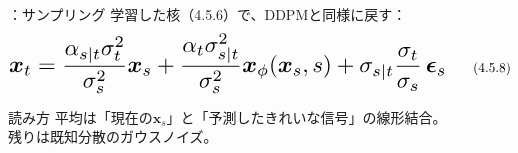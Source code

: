 \assuppl
\begin{frame}{\supplmark：サンプリング}
    学習した核（4.5.6）で、DDPMと同様に戻す：
    \[
        \resizebox{0.95\textwidth}{!}{$
        \bm{x}_t
        =
        \dfrac{\alpha_{s|t}\sigma_t^{2}}{\sigma_s^{2}}\bm{x}_s
        +
        \dfrac{\alpha_t\sigma_{s|t}^{2}}{\sigma_s^{2}}\bm{x}_\phi(\bm{x}_s,s)
        +
        \sigma_{s|t}\dfrac{\sigma_t}{\sigma_s}\,\bm{\epsilon}_s
        $}
        \tag{4.5.8}
    \]
    \begin{exampleblock}{読み方}
        平均は「現在の$\bm{x}_s$」と「予測したきれいな信号」の線形結合。\\
        残りは既知分散のガウスノイズ。
    \end{exampleblock}
\end{frame}
